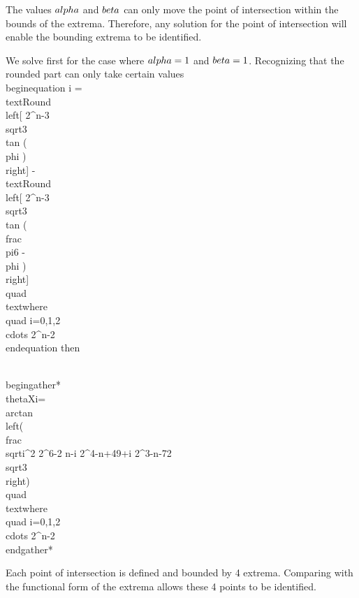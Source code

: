 The values $\\alpha$ and $\\beta$ can only move the point of intersection within the bounds of the extrema. Therefore, any solution for the point of intersection will enable the bounding extrema to be identified. 

We solve first for the case where $\\alpha=1$ and $\\beta=1$. Recognizing that the rounded part can only take certain values
\\begin{equation}
i =  \\text{Round}\\left[ 2^{n-3}\\sqrt{3} \\tan (\\phi ) \\right] - \\text{Round}\\left[ 2^{n-3}\\sqrt{3} \\tan (\\frac{\\pi}{6} - \\phi ) \\right]
 \\quad \\text{where}\\quad i=0,1,2 \\cdots 2^{n-2}
 \\end{equation}
then


\\begin{gather*}
\\thetaX{i}=\\arctan\\left(\\frac{\\sqrt{i^2 2^{6-2 n}-i 2^{4-n}+49}+i 2^{3-n}-7}{2 \\sqrt{3}}\\right) \\quad \\text{where}\\quad i=0,1,2 \\cdots 2^{n-2}
\\end{gather*}

Each point of intersection is defined and bounded by 4 extrema. Comparing with the functional form of the extrema allows these 4 points to be identified.



